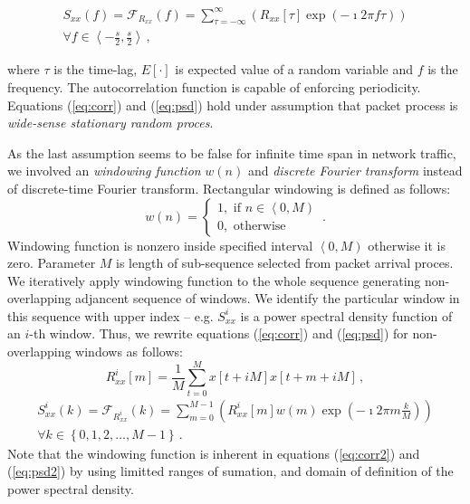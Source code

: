 \begin{equation}\label{eq:psd}
\begin{split}
S_{xx}(f) = \mathcal{F}_{R_{xx}}\left(f\right) = \sum_{\tau=-\infty}^{\infty} 
\left( R_{xx}\left[\tau\right] \exp\left( -\imath 2\pi f\tau \right)\right) \\ 
\forall f \in \left\langle -\frac{s}{2},\frac{s}{2} \right\rangle\, , 
\end{split}
\end{equation}

where $\tau$ is the time-lag, $E\left[\cdot\right]$ is expected value of a random variable and 
$f$ is the frequency. The autocorrelation function is capable of enforcing periodicity.
Equations (\ref{eq:corr}) and (\ref{eq:psd}) hold under assumption that packet process is
\emph{wide-sense stationary random proces}.

As the last assumption seems to be false for infinite time span in network  traffic, 
we involved an \emph{windowing function}  $w(n)$ and 
\emph{discrete Fourier transform} instead of discrete-time 
Fourier transform. Rectangular windowing is defined as follows:
\begin{equation}
w(n) = \left\lbrace \begin{array}{l} 
1, \mbox{ if } n\in \left\langle 0, M \right) \\ 
0, \mbox{ otherwise} \end{array}\right. \,.
\end{equation}
Windowing function is nonzero inside specified interval $\left\langle 0, M \right)$ 
otherwise it is zero. 
Parameter  $M$ is length of sub-sequence selected from packet arrival proces. 
We iteratively apply windowing function to the whole sequence generating 
non-overlapping adjancent sequence of windows. 
We identify the particular window in this sequence with upper index -- 
e.g. $S_{xx}^i$ is a power spectral density function of an $i$-th window.
Thus, we rewrite equations (\ref{eq:corr}) and (\ref{eq:psd}) for non-overlapping 
windows as follows:
\begin{equation}\label{eq:corr2}
R_{xx}^i\left[m\right] = \frac{1}{M} \sum_{t=0}^{M} x\left[t+iM\right]x\left[t+m+iM\right] \, , 
\end{equation}
\begin{equation}\label{eq:psd2}
\begin{split}
S_{xx}^i(k) = \mathcal{F}_{R_{xx}^i}\left(k\right) = \sum_{m=0}^{M-1}
\left( R_{xx}^i \left[m\right] w(m) \exp\left( -\imath 2\pi m\frac{k}{M} \right)\right)\\
\forall k \in \left\{ 0,1,2,...,M-1 \right\}\, . 
\end{split}
\end{equation}
Note that the windowing function is inherent in equations (\ref{eq:corr2}) and (\ref{eq:psd2})
by using limitted ranges of sumation, and domain of definition of the power spectral density.

